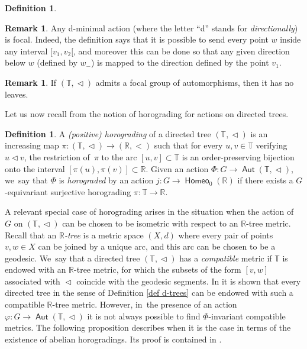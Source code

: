 \documentclass[JEP,XML,SOM,Unicode,NoFloatCountersInSection,published]{cedram}
\theoremstyle{definition}
\newtheorem{dfn}[thm]{Definition}
\newtheorem{rem}[thm]{Remark}
\DeclareMathOperator{\Aut}{\mathsf{Aut}}
\DeclareMathOperator{\homeo}{\mathsf{Homeo}}
\newcommand{\R}{\mathbb{R}}
\newcommand{\Tbb}{\mathbb T}
\newcommand{\treeorder}{\mathrel{\triangleleft}}
\begin{document}
\begin{dfn}
\begin{rem}\label{r.dminimal_is_focal} Any d-minimal action (where the letter ``d'' stands for \emph{directionally}) is focal. Indeed, the definition says that it is possible to send every point $w$ inside any interval $[v_1, v_2[$, and moreover this can be done so that any given direction below $w$ (defined by $w_-$) is mapped to the direction defined by the point $v_1$.
\end{rem}

\begin{rem} \label{r-no-leaves}
If $(\Tbb, \treeorder)$ admits a focal group of automorphisms, then it has no leaves.
\end{rem}

Let us now recall from \cite[\S 11.1.6]{BMRT} the notion of horograding for actions on directed trees.

\begin{dfn}
A \emph{(positive) horograding} of a directed tree $(\Tbb,\treeorder)$ is an increasing map $\pi\colon (\Tbb, \treeorder)\to (\R,<)$ such that for every $u,v\in \Tbb$ verifying $u\treeorder v$, the restriction of~$\pi$ to the arc $[u,v]\subset \Tbb$ is an order-preserving bijection onto the interval $[\pi(u),\pi(v)]\subset \R$. Given an action $\Phi\colon G\to \Aut(\Tbb,\treeorder)$, we~say that $\Phi$ is \emph{horograded} by an action $j\colon G\to \homeo_0(\R)$ if there exists a $G$-equivariant surjective horograding $\pi\colon\Tbb\to \R$.
\end{dfn}

A relevant special case of horograding arises in the situation when the action of~$G$ on $(\Tbb, \treeorder)$ can be chosen to be isometric with respect to an $\R$-tree metric. Recall that an $\R$\emph{-tree} is a metric space $(X,d)$ where every pair of points $v,w\in X$ can be joined by a unique arc, and this arc can be chosen to be a geodesic. We~say that a directed tree $(\Tbb,\treeorder)$ has a \emph{compatible} metric if $\Tbb$ is endowed with an $\R$-tree metric, for which the subsets of the form $[v,w]$ associated with $\treeorder$ coincide with the geodesic segments. In \cite[\S 11.3.1]{BMRT} it is shown that every directed tree in the sense of Definition \ref{def d-trees} can be endowed with such a compatible $\R$-tree metric. However, in~the presence of an action $\varphi\colon G\to\Aut(\Tbb,\treeorder)$ it is not always possible to find $\Phi $\nobreakdash-invariant compatible metrics. The following proposition describes when it is the case in terms of the existence of abelian horogradings. Its proof is contained in \cite[Prop.\,11.3.1 \& 11.3.3]{BMRT}.


\end{dfn}
\end{document}
